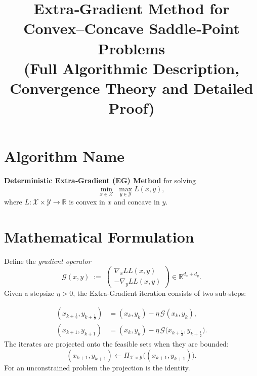 \documentclass{article}
\newcommand{\R}{\mathbb{R}}
\newcommand{\gradx}{\nabla_{x}L}
\newcommand{\grady}{\nabla_{y}L}
\newcommand{\G}{\mathcal{G}}
\begin{document}
\title{Extra‑Gradient Method for Convex–Concave Saddle‑Point Problems\\
(Full Algorithmic Description, Convergence Theory and Detailed Proof)}
\author{}
\date{}
\maketitle

\section*{Algorithm Name}
\textbf{Deterministic Extra‑Gradient (EG) Method} for solving 
\[
\min_{x\in\mathcal{X}}\;\max_{y\in\mathcal{Y}} L(x,y),
\]
where $L:\mathcal{X}\times\mathcal{Y}\rightarrow\R$ is convex in $x$ and concave in $y$.

\section*{Mathematical Formulation}
Define the \emph{gradient operator}
\[
\G(x,y)\;:=\;\begin{pmatrix}
\gradx L(x,y)\\[2mm]
-\grady L(x,y)
\end{pmatrix}
\in\R^{d_x+d_y}.
\]
Given a stepsize $\eta>0$, the Extra‑Gradient iteration consists of two sub‑steps:

\begin{align}
(x_{k+\frac12},y_{k+\frac12}) 
&= (x_k,y_k)-\eta\,\G(x_k,y_k),\label{eq:extrap}\\[2mm]
(x_{k+1},y_{k+1}) 
&= (x_k,y_k)-\eta\,\G\!\bigl(x_{k+\frac12},y_{k+\frac12}\bigr).\label{eq:update}
\end{align}
The iterates are projected onto the feasible sets when they are bounded:
\[
(x_{k+1},y_{k+1})\leftarrow\Pi_{\mathcal{X}\times\mathcal{Y}}\bigl((x_{k+1},y_{k+1})\bigr).
\]
For an unconstrained problem the projection is the identity.

\end{document}
